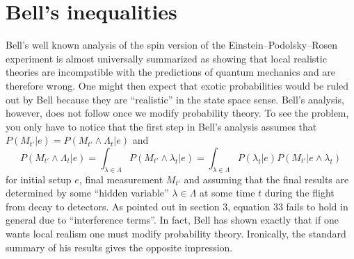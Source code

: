 \documentclass[12pt]{article}
\begin{document}

\section{Bell's inequalities}

    Bell's well known analysis of the spin version of the Einstein--Podolsky--Rosen
experiment\cite{bell} is  
almost universally summarized as showing that local realistic theories
are incompatible with the predictions of quantum mechanics and are 
therefore wrong.  One might then expect that exotic probabilities
would be ruled out by Bell because they are ``realistic'' in the state space
sense. 
Bell's analysis, however, does not follow once we modify probability theory.
To see the problem, you only have to notice that the first step in Bell's
analysis
assumes that $P(M_{t'}|e)=P(M_{t'}\wedge \Lambda_t |e)$ and
\begin{equation}
P(M_{t'}\wedge \Lambda_t|e) = \int_{\lambda\in\Lambda} P(M_{t'}\wedge\lambda_{t}|e) = 
\int_{\lambda\in\Lambda} P(\lambda_{t}|e)P(M_{t'}|e\wedge \lambda_{t})
\end{equation}
for initial setup $e$, final measurement $M_{t'}$ and assuming that
the final results are determined by some ``hidden variable'' 
$\lambda\in\Lambda$ at some time $t$ during the flight from decay 
to detectors.  As pointed out
in section 3, equation 33 fails to hold in general due to ``interference terms''\cite{pl}.  
In fact, Bell has shown exactly that if one wants local realism one must modify
probability theory.  Ironically, the standard summary of his results 
gives the opposite impression.
\end{document}
